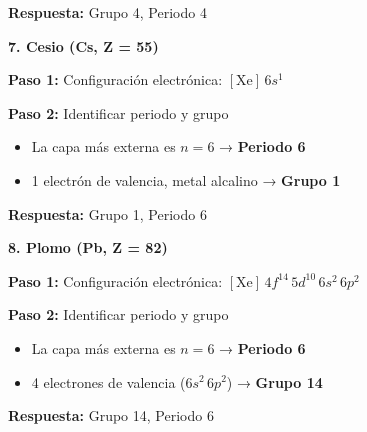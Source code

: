 \begin{exercise}
\begin{solu}
        \textbf{Respuesta:} Grupo 4, Periodo 4

        \textbf{7. Cesio (Cs, Z = 55)}

        \textbf{Paso 1:} Configuración electrónica: \([\text{Xe}] \, 6s^1\)

        \textbf{Paso 2:} Identificar periodo y grupo
        \begin{itemize}
            \item La capa más externa es \(n = 6\) → \textbf{Periodo 6}
            \item 1 electrón de valencia, metal alcalino → \textbf{Grupo 1}
        \end{itemize}

        \textbf{Respuesta:} Grupo 1, Periodo 6

        \textbf{8. Plomo (Pb, Z = 82)}

        \textbf{Paso 1:} Configuración electrónica: \([\text{Xe}] \, 4f^{14} \, 5d^{10} \, 6s^2 \, 6p^2\)

        \textbf{Paso 2:} Identificar periodo y grupo
        \begin{itemize}
            \item La capa más externa es \(n = 6\) → \textbf{Periodo 6}
            \item 4 electrones de valencia (\(6s^2 \, 6p^2\)) → \textbf{Grupo 14}
        \end{itemize}

        \textbf{Respuesta:} Grupo 14, Periodo 6


\end{solu}
\end{exercise}

